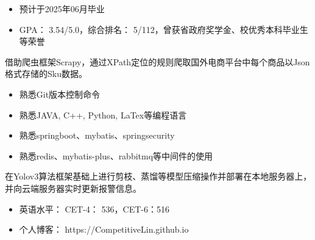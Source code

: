 


	






\begin{itemize}
	\item 预计于2025年06月毕业
\end{itemize}

\begin{itemize}
	\item GPA： 3.54/5.0，综合排名： 5/112，曾获省政府奖学金、校优秀本科毕业生等荣誉
\end{itemize}

\vspace{-\topsep}

借助爬虫框架Scrapy，通过XPath定位的规则爬取国外电商平台中每个商品以Json格式存储的Sku数据。


\begin{itemize}
	\item 熟悉Git版本控制命令
	\item 熟悉JAVA, C++, Python, LaTex等编程语言
	\item 熟悉springboot、mybatis、springsecurity
	\item 熟悉redis、mybatis-plus、rabbitmq等中间件的使用
\end{itemize}

\vspace{-\topsep}


在Yolov3算法框架基础上进行剪枝、蒸馏等模型压缩操作并部署在本地服务器上，并向云端服务器实时更新报警信息。


\begin{itemize}	
	\item 英语水平： CET-4： 536，CET-6：516
	\item 个人博客： https://CompetitiveLin.github.io
\end{itemize}


